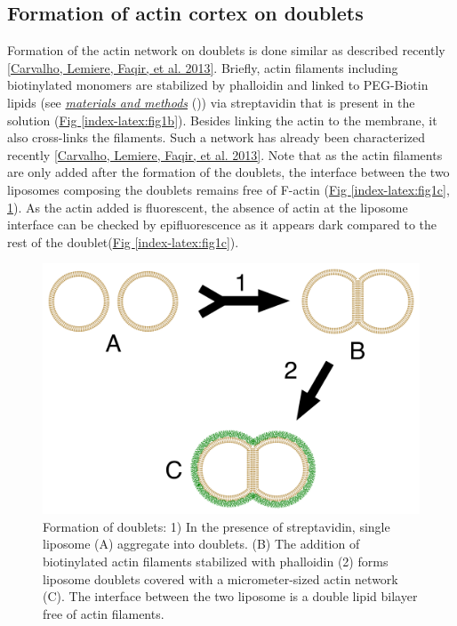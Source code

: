 \documentclass[A4paperpaper,11pt,english]{sphinxmanual}
\begin{document}
\subsection{Formation of actin cortex on doublets}
\label{index-latex:formation-of-actin-cortex-on-doublets}
Formation of the actin network on doublets is done similar as described
recently {\hyperref[index-latex:carvalho2013a]{{[}Carvalho, Lemiere, Faqir,  et al.  2013{]}}}.  Briefly, actin filaments including
biotinylated monomers are stabilized by phalloidin and linked to PEG-Biotin
lipids (see {\hyperref[index-latex:m-et-m]{\emph{materials and methods}}} ())  via streptavidin that is
present in the solution (\hyperref[index-latex:fig1b]{Fig  \ref*{index-latex:fig1b}}).  Besides linking the actin to the
membrane, it also cross-links the filaments.  Such a network has already been
characterized recently {\hyperref[index-latex:carvalho2013a]{{[}Carvalho, Lemiere, Faqir,  et al.  2013{]}}}.  Note that as the actin filaments
are only added after the formation of the doublets, the interface between the
two liposomes composing the doublets remains free of F-actin (\hyperref[index-latex:fig1c]{Fig  \ref*{index-latex:fig1c}}, \hyperref[index-latex:fds]{ \ref*{index-latex:fds}}). As the actin added is fluorescent, the absence of actin
at the liposome interface can be checked by epifluorescence as it appears dark
compared to the rest of the doublet(\hyperref[index-latex:fig1c]{Fig  \ref*{index-latex:fig1c}}).
\begin{figure}[htbp]
\centering
\capstart

\includegraphics[width=0.700\linewidth]{doublets-schema.png}
\caption{Formation of doublets: 1) In the presence of streptavidin, single liposome
(A) aggregate into doublets. (B) The addition of biotinylated actin
filaments stabilized with phalloidin (2) forms liposome doublets covered
with a micrometer-sized actin network (C). The interface between the two
liposome is a double lipid bilayer free of actin filaments.}\label{index-latex:fds}\end{figure}
\end{document}

